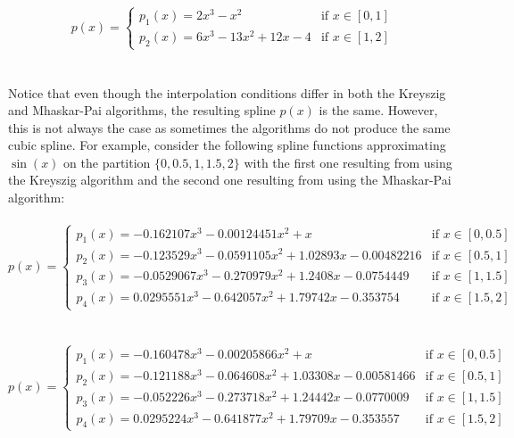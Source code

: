 \begin{equation}
p(x) = \begin{cases}
p_1(x)=2x^3-x^2 & \text{if } x \in [0,1]\\
p_2(x)=6x^3-13x^2+12x-4 & \text{if } x \in [1,2]
\end{cases}
\end{equation}
\\\\
Notice that even though the interpolation conditions differ in both the Kreyszig and Mhaskar-Pai algorithms, the resulting spline $p(x)$ is the same. However, this is not always the case as sometimes the algorithms do not produce the same cubic spline. For example, consider the following spline functions approximating $\sin(x)$ on the partition $\{0,0.5,1,1.5,2\}$ with the first one resulting from using the Kreyszig algorithm and the second one resulting from using the Mhaskar-Pai algorithm:\\\\
\begin{equation}
p(x) = \begin{cases}
p_1(x)=-0.162107x^3-0.00124451x^2+x & \text{if } x \in [0,0.5]\\
p_2(x)=-0.123529x^3-0.0591105x^2+1.02893x-0.00482216 & \text{if } x \in [0.5,1]\\
p_3(x)=-0.0529067x^3-0.270979x^2+1.2408x-0.0754449 & \text{if } x \in [1,1.5]\\
p_4(x)=0.0295551x^3-0.642057x^2+1.79742x-0.353754 & \text{if } x \in [1.5,2]
\end{cases}
\end{equation}
\\\\
\begin{equation}
p(x) = \begin{cases}
p_1(x)=-0.160478x^3-0.00205866x^2+x & \text{if } x \in [0,0.5]\\
p_2(x)=-0.121188x^3-0.064608x^2+1.03308x-0.00581466 & \text{if } x \in [0.5,1]\\
p_3(x)=-0.052226x^3-0.273718x^2+1.24442x-0.0770009 & \text{if } x \in [1,1.5]\\
p_4(x)=0.0295224x^3-0.641877x^2+1.79709x-0.353557 & \text{if } x \in [1.5,2]
\end{cases}
\end{equation}
\\\\
